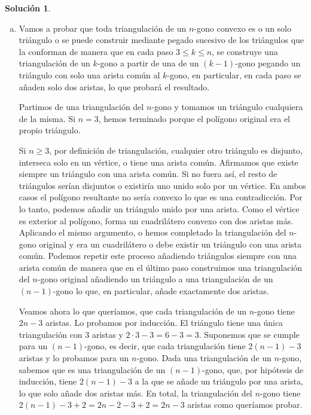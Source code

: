 \documentclass[10pt]{article}
\theoremstyle{definition}
\newtheorem*{sol}{Solución}
\begin{document}
\begin{sol}\leavevmode
\begin{enumerate}[(a)]
    \item Vamos a probar que toda triangulación de un $n$-gono convexo es o un solo triángulo o se puede construir mediante pegado sucesivo de los triángulos que la conforman de manera que en cada paso $3\leq k\leq n$, se construye una triangulación de un $k$-gono a partir de una de un $(k-1)$-gono pegando un triángulo con solo una arista común al $k$-gono, en particular, en cada paso se añaden solo dos aristas, lo que probará el resultado.
    
    Partimos de una triangulación del $n$-gono y tomamos un triángulo cualquiera de la misma. Si $n=3$, hemos terminado porque el polígono original era el propio triángulo.
    
    Si $n\geq 3$, por definición de triangulación, cualquier otro triángulo es disjunto, interseca solo en un vértice, o tiene una arista común. Afirmamos que existe siempre un triángulo con una arista común. Si no fuera así, el resto de triángulos serían disjuntos o existiría uno unido solo por un vértice. En ambos casos el polígono resultante no sería convexo lo que es una contradicción. Por lo tanto, podemos añadir un triángulo unido por una arista. Como el vértice es exterior al polígono, forma un cuadrilátero convexo con dos aristas más. Aplicando el mismo argumento, o hemos completado la triangulación del $n$-gono original y era un cuadrilátero o debe existir un triángulo con una arista común. Podemos repetir este proceso añadiendo triángulos siempre con una arista común de manera que en el último paso construimos una triangulación del $n$-gono original añadiendo un triángulo a una triangulación de un $(n-1)$-gono lo que, en particular, añade exactamente dos aristas.
    
    
    
    Veamos ahora lo que queríamos, que cada triangulación de un $n$-gono tiene $2n-3$ aristas. Lo probamos por inducción. El triángulo tiene una única triangulación con $3$ aristas y $2\cdot 3-3=6-3=3$. Suponemos que se cumple para un $(n-1)$-gono, es decir, que cada triangulación tiene $2(n-1)-3$ aristas y lo probamos para un $n$-gono. Dada una triangulación de un $n$-gono, sabemos que es una triangulación de un $(n-1)$-gono, que, por hipótesis de inducción, tiene $2(n-1)-3$ a la que se añade un triángulo por una arista, lo que solo añade dos aristas más. En total, la triangulación del $n$-gono tiene $2(n-1)-3+2=2n-2-3+2=2n-3$ aristas como queríamos probar.
    

\end{enumerate}
\end{sol}
\end{document}
